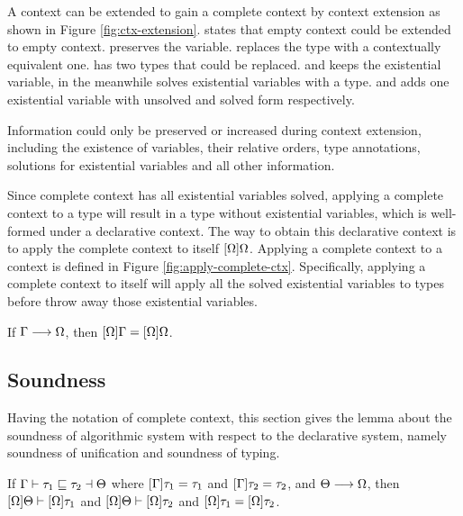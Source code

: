 A context can be extended to gain a complete context by context extension as shown in Figure \ref{fig:ctx-extension}.  states that empty context could be extended to empty context.  preserves the variable.  replaces the type with a contextually equivalent one.  has two types that could be replaced.  and  keeps the existential variable, in the meanwhile  solves existential variables with a type.  and  adds one existential variable with unsolved and solved form respectively.

Information could only be preserved or increased during context extension, including the existence of variables, their relative orders, type annotations, solutions for existential variables and all other information.

Since complete context has all existential variables solved, applying a complete context to a type will result in a type without existential variables, which is well-formed under a declarative context. The way to obtain this declarative context is to apply the complete context to itself $[\Omega]\Omega$. Applying a complete context to a context is defined in Figure \ref{fig:apply-complete-ctx}. Specifically, applying a complete context to itself will apply all the solved existential variables to types before throw away those existential variables.

\begin{lemma}
  \label{lemma:stability-of-complete-context}

  If $\Gamma \longrightarrow \Omega$, then $[\Omega]\Gamma = [\Omega]\Omega$.
\end{lemma}

\subsection{Soundness}

Having the notation of complete context, this section gives the lemma about the soundness of algorithmic system with respect to the declarative system, namely soundness of unification and soundness of typing.

\begin{theorem}

If $\Gamma \vdash \tau_1 \sqsubseteq \tau_2 \dashv \Theta$ where $[\Gamma] \tau_1 = \tau_1$ and $[\Gamma] \tau_2 = \tau_2$,
and $\Theta \longrightarrow \Omega$,
then $[\Omega]\Theta \vdash [\Omega]\tau_1$ and $[\Omega]\Theta \vdash [\Omega]\tau_2$ and $[\Omega]\tau_1 = [\Omega]\tau_2$.
\end{theorem}


